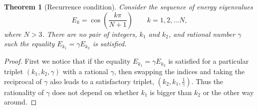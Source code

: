 \documentclass[a4paper, 10pt]{article}
\theoremstyle{plain}
\newtheorem*{theorem*}{Theorem}
\begin{document}
\begin{theorem*}[Recurrence condition]
    Consider the sequence of energy eigenvalues
    \begin{equation*}
        E_{k} = \cos{\!\left ( \frac{k \pi}{N+1} \right )}
        \qquad k=1, 2, \dots N,
    \end{equation*}
    where $N >3$. There are no pair of integers, $k_{1}$ and $k_{2}$, and
    rational number $\gamma$ such the equality $E_{k_{1}} = \gamma E_{k_{2}}$ is
    satisfied.
\end{theorem*}
\begin{proof}
    First we notice that if the equality $E_{k_{1}} = \gamma E_{k_{2}}$ is
    satisfied for a particular triplet $(k_{1}, k_{2}, \gamma)$ with a rational
    $\gamma$, then swapping the indices and taking the reciprocal of $\gamma$
    also leads to a satisfactory triplet, $(k_{2}, k_{1}, \frac{1}{\gamma})$.
    Thus the rationality of $\gamma$ does not depend on whether $k_{1}$ is
    bigger than $k_{2}$ or the other way around.


\end{proof}
\end{document}
